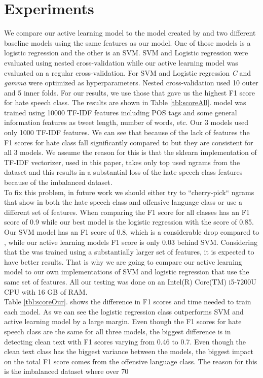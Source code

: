 \documentclass[10pt, a4paper]{article}
\begin{document}
	\section{Experiments}
	We compare our active learning model to the model created by \citet{Davidson2017AutomatedHS} and two different baseline models using the same features as our model. One of those models is a logistic regression and the other is an SVM. SVM and Logistic regression were evaluated using nested cross-validation while our active learning model was evaluated on a regular cross-validation. For SVM and Logistic regression \textit{C} and \textit{gamma} were optimized as hyperparameters. Nested cross-validation used 10 outer and 5 inner folds. For our results, we use those that gave us the highest F1 score for hate speech class. The results are shown in Table \ref{tbl:scoreAll}. \citet{Davidson2017AutomatedHS} model was trained using 10000 TF-IDF features including POS tags and some general information features as tweet length, number of words, etc. Our 3 models used only 1000 TF-IDF features. We can see that because of the lack of features the F1 scores for hate class fall significantly compared to \citet{Davidson2017AutomatedHS} but they are consistent for all 3 models. We assume the reason for this is that the sklearn implementation of TF-IDF vectorizer, used in this paper, takes only top used ngrams from the dataset and this results in a substantial loss of the hate speech class features because of the imbalanced dataset.  
	\\To fix this problem, in future work we should either try to “cherry-pick“ ngrams that show in both the hate speech class and offensive language class or use a different set of features. When comparing the F1 score for all classes \citet{Davidson2017AutomatedHS} has an F1 score of 0.9 while our best model is the logistic regression with the score of 0.85. Our SVM model has an F1 score of 0.8, which is a considerable drop compared to \citet{Davidson2017AutomatedHS}, while our active learning models F1 score is only 0.03 behind SVM. Considering that the \citet{Davidson2017AutomatedHS} was trained using a substantially larger set of features, it is expected to have better results. That is why we are going to compare our active learning model to our own implementations of SVM and logistic regression that use the same set of features. All our testing was done on an Intel(R) Core(TM) i5-7200U CPU with 16 GB of RAM. 
	\\Table \ref{tbl:scoreOur}. shows the difference in F1 scores and time needed to train each model. As we can see the logistic regression class outperforms SVM and active learning model by a large margin. Even though the F1 scores for hate speech class are the same for all three models, the biggest difference is in detecting clean text with F1 scores varying from 0.46 to 0.7. Even though the clean text class has the biggest variance between the models, the biggest impact on the total F1 score comes from the offensive language class. The reason for this is the imbalanced dataset where over 70%
\end{document}

